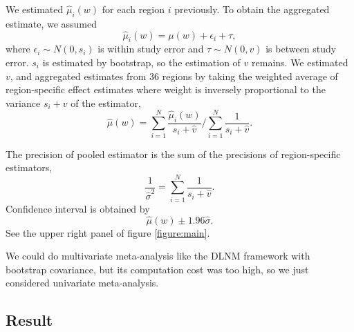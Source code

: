 \documentclass[12pt]{article}
\begin{document}
We estimated $\hat{\mu}_i(w)$ for each region $i$ previously.
To obtain the aggregated estimate, we assumed
\begin{equation}
	\hat{\mu}_i(w) = \mu(w) + \epsilon_i + \tau,
	\label{eqn:rcmmeta}
\end{equation}
where $\epsilon_i \sim N(0, s_i)$ is within study error and $\tau \sim N(0, v)$ is between study error.
$s_i$ is estimated by bootstrap,
so the estimation of $v$ remains.
We estimated $v$, and aggregated estimates from 36 regions
by taking the weighted average of region-specific effect estimates
where weight is inversely proportional to the variance $s_i + v$ of the estimator,
\begin{equation}
	\hat{\mu}(w) = \sum_{i = 1}^N \frac{\hat{\mu}_i(w)}{s_i + \hat{v}}
	/\sum_{i = 1}^N \frac{1}{s_i + \hat{v}}.
	\label{eqn:pooling}
\end{equation}

The precision of pooled estimator is the sum of the precisions of region-specific estimators,
\begin{equation}
	\frac{1}{\hat{\sigma}^2} = \sum_{i = 1}^N \frac{1}{s_i + \hat{v}}.
	\label{eqn:pooled precision}
\end{equation}
Confidence interval is obtained by 
\begin{equation}
	\hat{\mu}(w) \pm 1.96 \hat{\sigma}.
	\label{eqn:confidence interval}
\end{equation}
See the upper right panel of figure \ref{figure:main}.

We could do multivariate meta-analysis like the DLNM framework with bootstrap covariance,
but its computation cost was too high, so we just considered univariate meta-analysis.


\subsection{Result}
\end{document}
